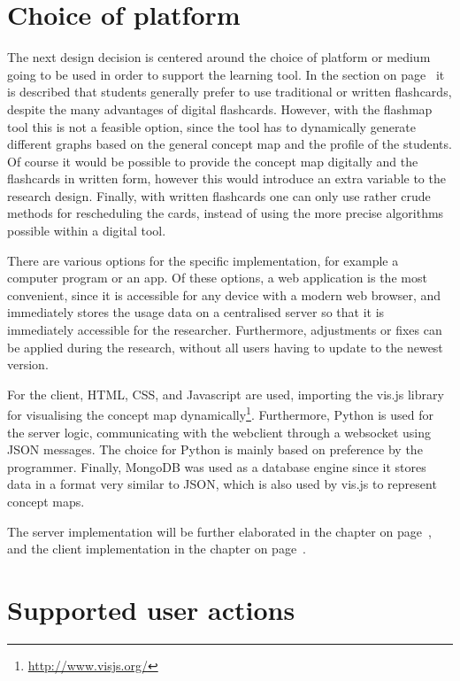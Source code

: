 \section{Choice of platform}

The next design decision is centered around the choice of platform or medium going to be used in order to support the learning tool. In the section  on page~\pageref{subsec:fcapplication} it is described that students generally prefer to use traditional or written flashcards, despite the many advantages of digital flashcards. However, with the flashmap tool this is not a feasible option, since the tool has to dynamically generate different graphs based on the general concept map and the profile of the students. Of course it would be possible to provide the concept map digitally and the flashcards in written form, however this would introduce an extra variable to the research design. Finally, with written flashcards one can only use rather crude methods for rescheduling the cards, instead of using the more precise algorithms possible within a digital tool.

There are various options for the specific implementation, for example a computer program or an app. Of these options, a web application is the most convenient, since it is accessible for any device with a modern web browser, and immediately stores the usage data on a centralised server so that it is immediately accessible for the researcher. Furthermore, adjustments or fixes can be applied during the research, without all users having to update to the newest version.

For the client, HTML, CSS, and Javascript are used, importing the vis.js library for visualising the concept map dynamically\footnote{\url{http://www.visjs.org/}}. Furthermore, Python is used for the server logic, communicating with the webclient through a websocket using JSON messages. The choice for Python is mainly based on preference by the programmer. Finally, MongoDB was used as a database engine since it stores data in a format very similar to JSON, which is also used by vis.js to represent concept maps.

The server implementation will be further elaborated in the  chapter on page~\pageref{ch:server}, and the client implementation in the  chapter on page~\pageref{ch:client}.

\section{Supported user actions}

